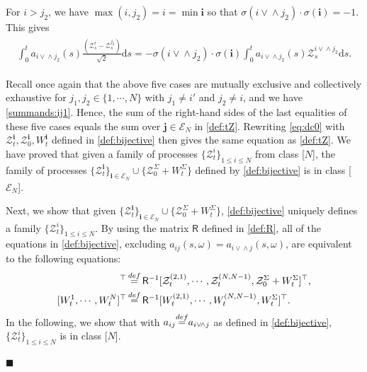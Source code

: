 \documentclass[12pt, twoside]{article}
\numberwithin{figure}{section}
\newcommand{\1}{\mathds 1}
\newcommand{\mc}{\mathcal}
\renewcommand{\d}{{\mathrm d}}
\newcommand{\2}{{\mathbf 1}}
\newcommand{\defeq}{{\stackrel{\rm def}{=}}}
\renewenvironment{proof}[1][\proofname]{\noindent {\bfseries #1.}\;}{\hfill\ensuremath{\blacksquare}\\}
\newcommand{\cc}{{^\circ}}
\newcommand{\bi}{\mathbf i}
\newcommand{\bj}{\mathbf j}
\newcommand{\two}{{\sqrt{2}}}
\begin{document}
\begin{proof}[Proof of Proposition~\ref{prop:RM} (2$\cc$)]
\begin{align}
\begin{aligned}
\end{aligned}
\end{align}
 For $i>j_2$, we have $\max(i,j_2)=i=\min \bi$ so that $\sigma(i\!\vee\!\!\wedge j_2)\cdot \sigma(\bi)=-1$. This gives
\begin{align}
\begin{aligned}\label{eq:dc5}
\int_0^t a_{i\vee\!\wedge j_2}(s)\frac{(\mc Z^i_s-\mc Z^{j_2}_s)}{\two} \d s=-\sigma(i\!\vee\!\!\wedge j_2)\cdot \sigma(\bi)\int_0^t a_{i\vee\!\wedge j_2}(s)\mc Z^{i\vee\!\wedge j_2}_s\d s.
\end{aligned}
\end{align}

Recall once again that the above five cases are mutually exclusive and collectively exhaustive for $j_1,j_2\in \{1,\cdots,N\}$ with $j_1\neq i\prime$ and $j_2\neq i$, and we have \eqref{summands:ij1}. Hence, the sum of the right-hand sides of the last equalities of these five cases equals the sum over $\bj\in \mc E_N$ in \eqref{def:tZ}. Rewriting \eqref{eq:dc0} with $\mc Z^\bi_t,\mc Z^\bi_0,W^\bi_t$ defined in \eqref{def:bijective} then gives the same equation as \eqref{def:tZ}. We have proved that given a family of processes $\{\mc Z^i_t \}_{1\leq i\leq N}$ from class [$N$], the family of processes $\{\mathcal Z^\bi_t \}_{\bi\in \mc E_N}\cup \{\mc Z^\Sigma_0+W^\Sigma_t \}$ defined by \eqref{def:bijective} is in class [$\mathcal E_N$].

Next, we show that given $\{\mathcal Z^\bi_t \}_{\bi\in \mc E_N}\cup \{\mc Z^\Sigma_0+W^\Sigma_t \}$, \eqref{def:bijective} uniquely defines 
a family
$\{\mc Z^i_t \}_{1\leq i\leq N}$. By using the matrix $\mathsf R$ defined in \eqref{def:R}, all of the equations in 
\eqref{def:bijective}, excluding $a_{ij}(s,\omega)=a_{i\vee\!\wedge j}(s,\omega)$, are equivalent to the following equations:
\begin{align}
[\mc Z^1_t,\cdots,\mc Z^N_t]^\top&\,\defeq\, \mathsf R^{-1}[\mc Z^{(2,1)}_t,\cdots,\mc Z^{(N,N-1)}_t, \mc Z^\Sigma_0+W^\Sigma_t]^\top,\label{def:dc-invZ}\\
[ W^1_t,\cdots, W^N_t]^\top&\,\defeq\, \mathsf R^{-1}[ W^{(2,1)}_t,\cdots, W^{(N,N-1)}_t,W^\Sigma_t]^\top.\label{def:dc-invB}
\end{align}
In the following, we show that
with $a_{ij}\defeq a_{i\vee\!\wedge j}$ as defined in \eqref{def:bijective}, $\{\mc Z^i_t\}_{1\leq i\leq N}$ is in class [$N$]. \medskip 


\end{proof}
\end{document}
